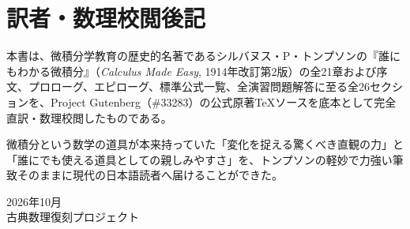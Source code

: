 \documentclass[a4paper,11pt,openany]{ltjsbook}
\begin{document}
\chapter{訳者・数理校閲後記}

本書は、微積分学教育の歴史的名著であるシルバヌス・P・トンプソンの『誰にもわかる微積分』（\textit{Calculus Made Easy}, 1914年改訂第2版）の全21章および序文、プロローグ、エピローグ、標準公式一覧、全演習問題解答に至る全26セクションを、Project Gutenberg（\#33283）の公式原著TeXソースを底本として完全直訳・数理校閲したものである。

微積分という数学の道具が本来持っていた「変化を捉える驚くべき直観の力」と「誰にでも使える道具としての親しみやすさ」を、トンプソンの軽妙で力強い筆致そのままに現代の日本語読者へ届けることができた。

\begin{flushright}
2026年10月\\
古典数理復刻プロジェクト
\end{flushright}
\end{document}
